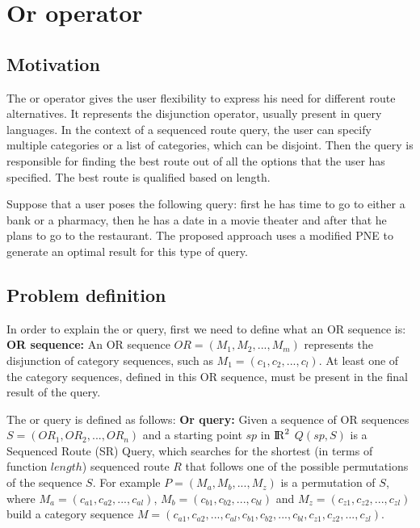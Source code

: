 


\section{Or operator}

\subsection{Motivation}
\label{sec:motOR}
The or operator gives the user flexibility to express his need for different route alternatives. It represents the disjunction operator, usually present in query languages. In the context of a sequenced route query, the user can specify multiple categories or a list of categories, which can be disjoint. Then the query is responsible for finding the best route out of all the options that the user has specified. The best route is qualified based on length.

Suppose that a user poses the following query: first he has time to go to either a bank or a pharmacy, then he has a date in a movie theater and after that he plans to go to the restaurant. The proposed approach uses a modified PNE to generate an optimal result for this type of query.

\subsection{Problem definition} 
\label{sec:problemOr}
In order to explain the or query, first we need to define what an OR sequence is: \newline
\textbf{OR sequence:} An OR sequence $OR = (M_1, M_2, ..., M_m)$ represents the disjunction of category sequences, such as $M_1 = (c_1, c_2, ..., c_l)$. At least one of the category sequences, defined in this OR sequence, must be present in the final result of the query.

The or query is defined as follows: \newline
\textbf{Or query:} Given a sequence of OR sequences $S = (OR_1, OR_2, ..., OR_n)$ and a starting point $sp$ in ${\rm I\!R}^2$
$Q(sp, S)$ is a Sequenced Route (SR) Query, which searches for the shortest (in terms of function $length$) sequenced route $R$ that follows one of the possible permutations of the sequence $S$. 
For example $P = (M_a, M_b, ..., M_z)$ is a permutation of $S$, where $M_a = (c_{a1}, c_{a2}, ..., c_{al})$, $M_b = (c_{b1}, c_{b2}, ..., c_{bl})$ and $M_z = (c_{z1}, c_{z2}, ..., c_{zl})$ build a category sequence \newline
$M = (c_{a1}, c_{a2}, ..., c_{al}, c_{b1}, c_{b2}, ..., c_{bl}, c_{z1}, c_{z2}, ..., c_{zl})$.

